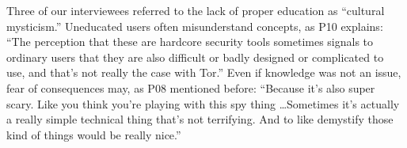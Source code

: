 Three of our interviewees referred to the lack of proper education as ``cultural
mysticism.''  Uneducated users often misunderstand concepts, as P10 explains:
``The perception that these are hardcore security tools sometimes signals to
ordinary users that they are also difficult or badly designed or complicated to
use, and that's not really the case with Tor.''  Even if knowledge was not an
issue, fear of consequences may, as P08 mentioned before: ``Because it's also
super scary. Like you think you're playing with this spy thing \ldots Sometimes
it's actually a really simple technical thing that's not terrifying.  And to
like demystify those kind of things would be really nice.''
